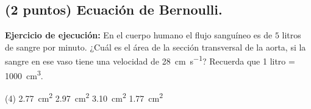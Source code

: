 \documentclass[12pt, letter]{exam}
\begin{document}
\begin{questions}
    \section{(2 puntos) Ecuación de Bernoulli.}

    \question \label{Ejercicio_09} \label{Problema_01} \textbf{Ejercicio de ejecución: } En el cuerpo humano el flujo sanguíneo es de $5$ litros de sangre por minuto. ¿Cuál es el área de la sección transversal de la aorta, si la sangre en ese vaso tiene una velocidad de \SI{28}{\centi\meter\per\second}? Recuerda que 1 litro = \SI{1000}{\cubic\centi\meter}.
    \begin{tasks}(4)
        \task \SI{2.77}{\square\centi\meter}
        \task \SI{2.97}{\square\centi\meter}
        \task \SI{3.10}{\square\centi\meter}
        \task \SI{1.77}{\square\centi\meter}
    \end{tasks}
        


\end{questions}
\end{document}

